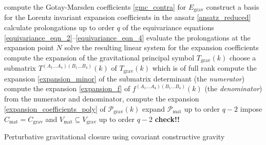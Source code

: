 \begin{algorithm}[H]\label{perturbative_algorithm}
  \DontPrintSemicolon
  compute the Gotay-Marsden coefficients \eqref{gmc_contra} for $E_\text{grav}$ \;
  construct a basis for the Lorentz invariant expansion coefficients in the ansatz \eqref{ansatz_reduced}\;
  calculate prolongations up to order $q$ of the equivariance equations \eqref{equivariance_eqn_2}--\eqref{equivariance_eqn_4} \;
  evaluate the prolongations at the expansion point $N$ \;
  solve the resulting linear system for the expansion coefficients \;
  compute the expansion of the gravitational principal symbol $T_\text{grav}(k)$ \;
  choose a submatrix $T^{(A_1\dots A_4)(B_1\dots B_4)}(k)$ of $T_\text{grav}(k)$ which is of full rank \;
  compute the expansion \eqref{expansion_minor} of the submatrix determinant (the \emph{numerator}) \;
  compute the expansion \eqref{expansion_f} of $f^{(A_1\dots A_4)(B_1\dots B_4)}(k)$ (the \emph{denominator}) \;
  from the numerator and denominator, compute the expansion \eqref{expansion_coefficients_poly} of $\mathcal P_\text{grav}(k)$ \;
  expand $\mathcal P_\text{mat}$ up to order $q-2$ \;
  impose $C_\text{mat} = C_\text{grav}$ and $V_\text{mat} \subseteq V_\text{grav}$ up to order $q-2$ \textbf{check!!} \;
  \caption{Perturbative gravitational closure using covariant constructive gravity}
\end{algorithm}

